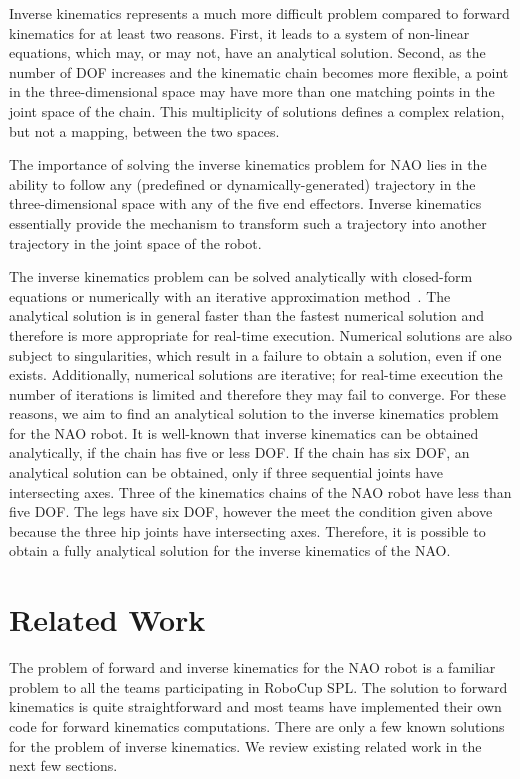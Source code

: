 Inverse kinematics represents a much more difficult problem compared to forward kinematics for at least two reasons. First, it leads to a system of non-linear equations, which may, or may not, have an analytical solution. Second, as the number of DOF increases and the kinematic chain becomes more flexible, a point in the three-dimensional space may have more than one matching points in the joint space of the chain. This multiplicity of solutions defines a complex relation, but not a mapping, between the two spaces.

The importance of solving the inverse kinematics problem for NAO lies in the ability to follow any (predefined or dynamically-generated) trajectory in the three-dimensional space with any of the five end effectors. Inverse kinematics essentially provide the mechanism to transform such a trajectory into another trajectory in the joint space of the robot. 

The inverse kinematics problem can be solved analytically with closed-form equations or numerically with an iterative approximation method~\cite{jacobianInverse}. The analytical solution is in general faster than the fastest numerical solution and therefore is more appropriate for real-time execution. Numerical solutions are also subject to singularities, which result in a failure to obtain a solution, even if one exists. Additionally, numerical solutions are iterative; for real-time execution the number of iterations is limited and therefore they may fail to converge. For these reasons, we aim to find an analytical solution to the inverse kinematics problem for the NAO robot. It is well-known that inverse kinematics can be obtained analytically, if the chain has five or less DOF. If the chain has six DOF, an analytical solution can be obtained, only if three sequential joints have intersecting axes. Three of the kinematics chains of the NAO robot have less than five DOF. The legs have six DOF, however the meet the condition given above because the three hip joints have intersecting axes. Therefore, it is possible to obtain a fully analytical solution for the inverse kinematics of the NAO. 


\section{Related Work}

The problem of forward and inverse kinematics for the NAO robot is a familiar problem to all the teams participating in RoboCup SPL. The solution to forward kinematics is quite straightforward and most teams have implemented their own code for forward kinematics computations. There are only a few known solutions for the problem of inverse kinematics. We review existing related work in the next few sections. 

